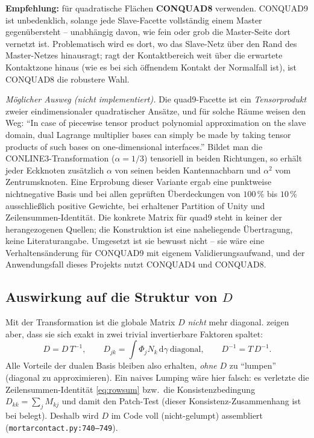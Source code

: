 \documentclass[a4paper,11pt]{article}
\def\bm#1{#1}%
\def\tfrac#1#2{#1/#2}%
\def\tilde#1{#1}%
\newcommand{\file}[1]{\texttt{\small #1}}
\begin{document}
\medskip
\noindent\textbf{Empfehlung:} für quadratische Flächen \textbf{CONQUAD8} verwenden. CONQUAD9 ist
unbedenklich, solange jede Slave-Facette vollständig einem Master gegenübersteht -- unabhängig
davon, wie fein oder grob die Master-Seite dort vernetzt ist. Problematisch wird es dort, wo das
Slave-Netz über den Rand des Master-Netzes hinausragt; ragt der Kontaktbereich weit über die
erwartete Kontaktzone hinaus (wie es bei sich öffnendem Kontakt der Normalfall ist), ist CONQUAD8
die robustere Wahl.

\medskip
\noindent\textit{Möglicher Ausweg (nicht implementiert).} Die quad9-Facette ist ein
\emph{Tensorprodukt} zweier eindimensionaler quadratischer Ansätze, und für solche Räume weisen
\citet[S.~109]{lamichhane2005} den Weg: ``In case of piecewise tensor product polynomial
approximation on the slave domain, dual Lagrange multiplier bases can simply be made by taking
tensor products of such bases on one-dimensional interfaces.'' Bildet man die
CONLINE3-Transformation ($\alpha=\tfrac13$) tensoriell in beiden Richtungen, so erhält jeder
Eckknoten zusätzlich $\alpha$ von seinen beiden Kantennachbarn und $\alpha^2$ vom Zentrumsknoten.
Eine Erprobung dieser Variante ergab eine punktweise nichtnegative Basis und bei allen geprüften
Überdeckungen von $100\,\%$ bis $10\,\%$ ausschließlich positive Gewichte, bei erhaltener Partition
of Unity und Zeilensummen-Identität. Die konkrete Matrix für quad9 steht in keiner der
herangezogenen Quellen; die Konstruktion ist eine naheliegende Übertragung, keine Literaturangabe.
Umgesetzt ist sie bewusst nicht -- sie wäre eine Verhaltensänderung für CONQUAD9 mit eigenem
Validierungsaufwand, und der Anwendungsfall dieses Projekts nutzt CONQUAD4 und CONQUAD8.

\subsection{Auswirkung auf die Struktur von $\bm D$}
Mit der Transformation ist die globale Matrix $\bm D$ \emph{nicht} mehr diagonal.
\citet[Gl.~(4.12)]{popp2012} zeigen aber, dass sie sich exakt in zwei trivial invertierbare Faktoren spaltet:
\begin{equation}
\bm D = \tilde{\bm D}\,\bm T^{-1},
\qquad \tilde D_{jk} = \int \Phi_j \tilde N_k\,\mathrm d\gamma \ \text{diagonal},
\qquad \bm D^{-1} = \bm T\,\tilde{\bm D}^{-1}.
\end{equation}
Alle Vorteile der dualen Basis bleiben also erhalten, \emph{ohne} $\bm D$ zu ``lumpen'' (diagonal zu
approximieren). Ein naives Lumping wäre hier falsch: es verletzte die Zeilensummen-Identität
\eqref{eq:rowsum} bzw.\ die Konsistenzbedingung $\tilde D_{kk}=\sum_j M_{kj}$ und damit den
Patch-Test (dieser Konsistenz-Zusammenhang ist bei \citet[Abschn.~4.1]{cichosz} belegt).
Deshalb wird $\bm D$ im Code voll (nicht-gelumpt) assembliert (\file{mortarcontact.py:\allowbreak{}740--749}).
\end{document}
